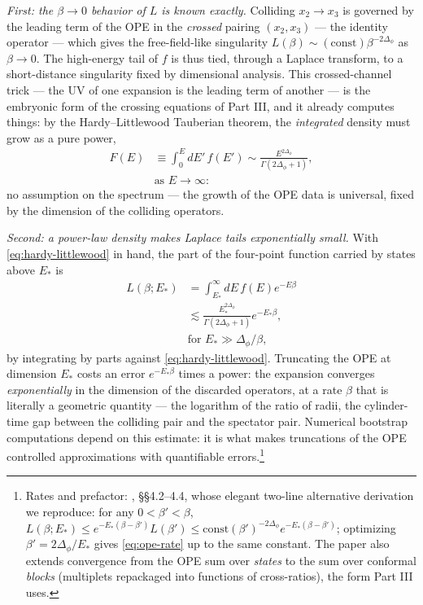 \emph{First: the $\beta \to 0$ behavior of $L$ is known exactly.} Colliding
$x_2 \to x_3$ is governed by the leading term of the OPE in the
\emph{crossed} pairing $(x_2, x_3)$ --- the identity operator --- which gives
the free-field-like singularity $L(\beta) \sim (\text{const})
\beta^{-2\Delta_\phi}$ as $\beta \to 0$. The high-energy tail of $f$ is thus
tied, through a Laplace transform, to a short-distance singularity fixed by
dimensional analysis. This crossed-channel trick --- the UV of one expansion
is the leading term of another --- is the embryonic form of the crossing
equations of Part III, and it already computes things: by the Hardy--Littlewood
Tauberian theorem, the \emph{integrated} density must grow as a pure power,
\begin{equation}
\begin{aligned}
F(E) &\equiv \int_0^E dE'\, f(E')
\sim \frac{E^{2\Delta_\phi}}{\Gamma(2\Delta_\phi + 1)},\\
&\text{as } E \to \infty:
\end{aligned}
\label{eq:hardy-littlewood}
\end{equation}
no assumption on the spectrum --- the growth of the OPE data is universal,
fixed by the dimension of the colliding operators.

\emph{Second: a power-law density makes Laplace tails exponentially small.}
With \eqref{eq:hardy-littlewood} in hand, the part of the four-point function
carried by states above $E_*$ is
\begin{equation}
\begin{aligned}
L(\beta; E_*) &= \int_{E_*}^\infty dE\, f(E) e^{-E\beta}\\
&\lesssim
\frac{E_*^{2\Delta_\phi}}{\Gamma(2\Delta_\phi+1)} e^{-E_* \beta},\\
&\text{for } E_* \gg \Delta_\phi/\beta,
\end{aligned}
\label{eq:ope-rate}
\end{equation}
by integrating by parts against \eqref{eq:hardy-littlewood}. Truncating the
OPE at dimension $E_*$ costs an error $e^{-E_*\beta}$ times a power: the
expansion converges \emph{exponentially} in the dimension of the discarded
operators, at a rate $\beta$ that is literally a geometric quantity --- the
logarithm of the ratio of radii, the cylinder-time gap between the colliding
pair and the spectator pair. Numerical bootstrap computations depend on this
estimate: it is what makes truncations of the OPE controlled approximations
with quantifiable errors.\footnote{Rates and prefactor:
, \S\S4.2--4.4, whose elegant two-line alternative derivation
we reproduce: for any $0 < \beta' < \beta$, $L(\beta; E_*) \le
e^{-E_*(\beta - \beta')} L(\beta')\le \text{const}
(\beta')^{-2\Delta_\phi} e^{-E_*(\beta-\beta')}$; optimizing $\beta' =
2\Delta_\phi/E_*$ gives \eqref{eq:ope-rate} up to the same constant. The
paper also extends convergence from the OPE sum over \emph{states} to the
sum over conformal \emph{blocks} (multiplets repackaged into functions of
cross-ratios), the form Part III uses.}

